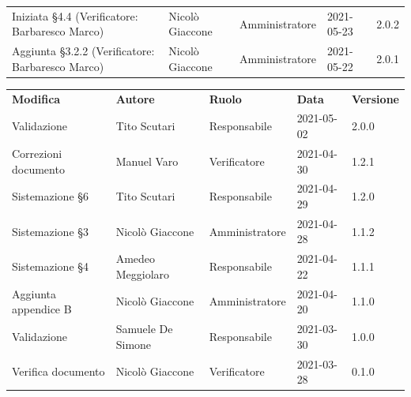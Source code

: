 \documentclass[a4paper]{article}
\begin{document}
\begin{center}
\begin{table}[h!]
\begin{tabular}{p{160px} p{90px} p{70px} p{55px} p{45px}}
            Iniziata \S 4.4   \newline(Verificatore: Barbaresco Marco)                                              & Nicolò Giaccone   & Amministratore   & 2021-05-23    & 2.0.2           \\
            Aggiunta \S 3.2.2 \newline(Verificatore: Barbaresco Marco)                                              & Nicolò Giaccone   & Amministratore   & 2021-05-22    & 2.0.1           \\
            
        \end{tabular}
    \end{table}

\begin{table}[h!]
    \centering
    \renewcommand{\arraystretch}{1.8}
    \begin{tabular}{p{160px} p{90px} p{70px} p{55px} p{45px}}
        \rowcolor{logo!70} \textbf{Modifica}                          & \textbf{Autore}   & \textbf{Ruolo} & \textbf{Data} & \textbf{Versione} \\
        Validazione                                                   & Tito Scutari      & Responsabile   & 2021-05-02    & 2.0.0             \\
        Correzioni documento                                          & Manuel Varo       & Verificatore   & 2021-04-30    & 1.2.1             \\
        Sistemazione \S 6                                             & Tito Scutari      & Responsabile   & 2021-04-29    & 1.2.0             \\
        Sistemazione \S 3                                             & Nicolò Giaccone   & Amministratore & 2021-04-28    & 1.1.2             \\
        Sistemazione \S 4                                             & Amedeo Meggiolaro & Responsabile   & 2021-04-22    & 1.1.1             \\
        Aggiunta appendice B                                          & Nicolò Giaccone   & Amministratore & 2021-04-20    & 1.1.0             \\
        Validazione                                                   & Samuele De Simone & Responsabile   & 2021-03-30    & 1.0.0             \\
        Verifica documento                                            & Nicolò Giaccone   & Verificatore   & 2021-03-28    & 0.1.0             \\

\end{tabular}
\end{table}
\end{center}
\end{document}
